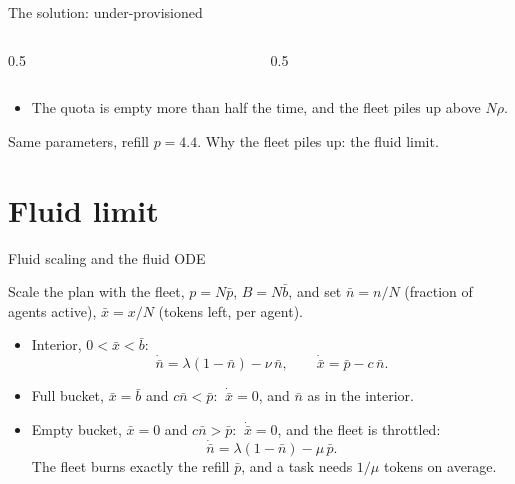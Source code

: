 \documentclass[aspectratio=169]{beamer}
\newenvironment*{myitem}[1][1.5em]{\begin{itemize}\setlength{\itemsep}{#1}}{\end{itemize}}
\begin{document}
\begin{frame}{The solution: under-provisioned}

	\begin{columns}
		\begin{column}{0.5\textwidth}
			
		\end{column}
		\begin{column}{0.5\textwidth}
			
		\end{column}
	\end{columns}

	\medskip
	\begin{myitem}[0.5em]
		\item The quota is \alert{empty} more than half the time, and the fleet \alert{piles up} above $N\rho$.
	\end{myitem}
	{\footnotesize Same parameters, refill $p=4.4$. Why the fleet piles up: the fluid limit.}
\end{frame}

\section{Fluid limit}

\begin{frame}{Fluid scaling and the fluid ODE}

	Scale the plan with the fleet, $p = N\bar p$, $B = N\bar b$, and set $\bar n = n/N$ (fraction of agents active), $\bar x = x/N$ (tokens left, per agent).

	\medskip

	\begin{myitem}
		\item \alert{Interior}, $0<\bar x<\bar b$:
		\begin{equation*}
			\dot{\bar n} = \lambda(1-\bar n) - \nu\,\bar n, \qquad \dot{\bar x} = \bar p - c\,\bar n .
		\end{equation*}
		\item \alert{Full bucket}, $\bar x=\bar b$ and $c\bar n<\bar p$: $\ \dot{\bar x}=0$, and $\bar n$ as in the interior.
		\item \alert{Empty bucket}, $\bar x=0$ and $c\bar n>\bar p$: $\ \dot{\bar x}=0$, and the fleet is \alert{throttled}:
		\begin{equation*}
			\dot{\bar n} = \lambda(1-\bar n) - \mu\,\bar p .
		\end{equation*}
		The fleet burns exactly the refill $\bar p$, and a task needs $1/\mu$ tokens on average.
	\end{myitem}
\end{frame}
\end{document}
